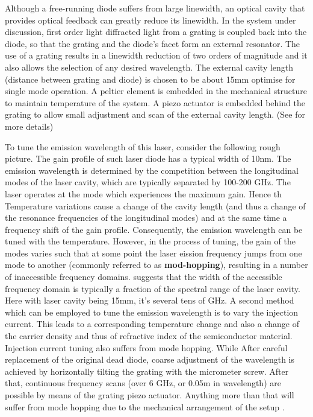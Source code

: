 \documentclass[11pt,A4Paper]{article}
\begin{document}
Although a free-running diode suffers from large linewidth, an optical cavity that provides optical feedback can greatly reduce its linewidth. In the system under discussion, first order light diffracted light from a grating is coupled back into the diode, so that the grating and the diode's facet form an external resonator. The use of a grating results in a linewidth reduction of two orders of magnitude and it also allows the selection of any desired wavelength. The external cavity length (distance between grating and diode) is chosen to be about 15mm optimise for single mode operation. A peltier element is embedded in the mechanical structure to maintain temperature of the system. A piezo actuator is embedded behind the grating to allow small adjustment and scan of the external cavity length. (See \cite{compactGratingDiodeLaser} for more details)
\par
To tune the emission wavelength of this laser, consider the following rough picture. The gain profile of such laser diode has a typical width of 10nm. The emission wavelength is determined by the competition between the longitudinal modes of the laser cavity, which are typically separated by 100-200 GHz. The laser operates at the mode which experiences the maximum gain. 
Hence th
Temperature variations cause a change of the cavity length (and thus a change of the resonance frequencies of the longitudinal modes) and at the same time a frequency shift of the gain profile. Consequently, the emission wavelength can be tuned with the temperature. However, in the process of tuning, the gain of the modes varies such that at some point the laser eission frequency jumps from one mode to another (commonly referred to as \textbf{mod-hopping}), resulting in a number of inaccessible frequency domains. \cite{compactGratingDiodeLaser} suggests that the width of the accessible frequency domain is typically a fraction of the spectral range of the laser cavity. Here with laser cavity being 15mm, it's several tens of GHz. A second method which can be employed to tune the emission wavelength is to vary the injection current. This leads to a corresponding temperature change and also a change of the carrier density and thus of refractive index of the semiconductor material. Injection current tuning also suffers from mode hopping. While
After careful replacement of the original dead diode, coarse adjustment of the wavelength is achieved by horizontally tilting the grating with the micrometer screw. After that, continuous frequency scans (over 6 GHz, or 0.05m in wavelength) are possible by means of the grating piezo actuator. Anything more than that will suffer from mode hopping due to the mechanical arrangement of the setup \cite{compactGratingDiodeLaser}. 
\end{document}
